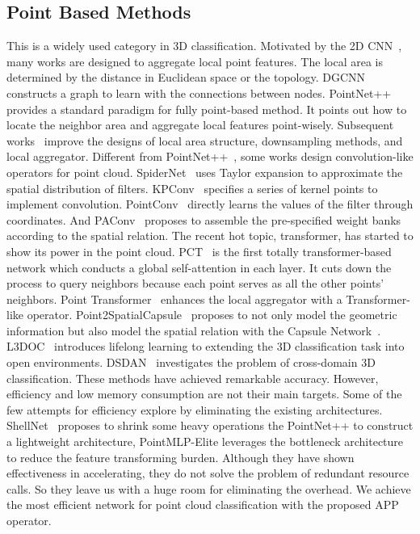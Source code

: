 \documentclass[journal]{IEEEtran}
\begin{document}
\subsection{Point Based Methods}
This is a widely used category in 3D classification. Motivated by the 2D CNN~\cite{krizhevsky2012imagenet,long2015fully}, many works are designed to aggregate local point features. The local area is determined by the distance in Euclidean space or the topology. DGCNN~\cite{DGCNN} constructs a graph to learn with the connections between nodes. PointNet++~\cite{PointNet++} provides a standard paradigm for fully point-based method. It points out how to locate the neighbor area and aggregate local features point-wisely. Subsequent works~\cite{shellnet,PointASNL} improve the designs of local area structure, downsampling methods, and local aggregator. Different from PointNet++~\cite{PointNet++}, some works design convolution-like operators for point cloud. SpiderNet~\cite{SpiderNet} uses Taylor expansion to approximate the spatial distribution of filters. KPConv~\cite{KPConv} specifies a series of kernel points to implement convolution. PointConv~\cite{pointconv} directly learns the values of the filter through coordinates. And PAConv~\cite{xu2021paconv} proposes to assemble the pre-specified weight banks according to the spatial relation. The recent hot topic, transformer, has started to show its power in the point cloud. PCT~\cite{guo2021pct} is the first totally transformer-based network which conducts a global self-attention in each layer. It cuts down the process to query neighbors because each point serves as all the other points' neighbors. Point Transformer~\cite{zhao2021point} enhances the local aggregator with a Transformer-like operator.  Point2SpatialCapsule~\cite{wen2020point2spatialcapsule} proposes to not only model the geometric information but also model the spatial relation with the Capsule Network~\cite{sabour2017dynamic}. L3DOC~\cite{liu2021l3doc} introduces lifelong learning to extending the 3D classification task into open environments. DSDAN~\cite{9483674} investigates the problem of cross-domain 3D classification. These methods have achieved remarkable accuracy. However, efficiency and low memory consumption are not their main targets. Some of the few attempts for efficiency explore by eliminating the existing architectures. ShellNet~\cite{shellnet} proposes to shrink some heavy operations the PointNet++ to construct a lightweight architecture, PointMLP-Elite leverages the bottleneck architecture to reduce the feature transforming burden. Although they have shown effectiveness in accelerating, they do not solve the problem of redundant resource calls. So they leave us with a huge room for eliminating the overhead. We achieve the most efficient network for point cloud classification with the proposed APP operator.
\end{document}
